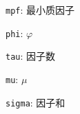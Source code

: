 \verb|mpf|: 最小质因子

\verb|phi|: \(\varphi\)

\verb|tau|: 因子数

\verb|mu|: \(\mu\)

\verb|sigma|: 因子和

